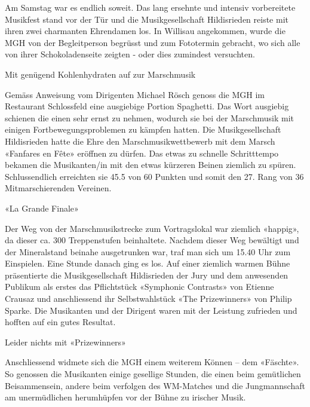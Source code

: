 \begin{history}
\begin{itemize}
              Am Samstag  war es endlich soweit. Das lang ersehnte und intensiv
              vorbereitete Musikfest stand vor der Tür und die Musikgesellschaft
              Hildisrieden reiste mit ihren zwei charmanten Ehrendamen los. In
              Willisau angekommen, wurde die MGH von der Begleitperson begrüsst und
              zum Fototermin gebracht, wo sich alle von ihrer Schokoladenseite zeigten
              - oder dies zumindest versuchten.

              Mit genügend Kohlenhydraten auf zur Marschmusik

              Gemäss Anweisung vom Dirigenten Michael Rösch genoss die MGH im
              Restaurant Schlossfeld eine ausgiebige Portion Spaghetti. Das Wort
              ausgiebig schienen die einen sehr ernst zu nehmen, wodurch sie bei der
              Marschmusik mit einigen Fortbewegungsproblemen zu kämpfen hatten. Die
              Musikgesellschaft Hildisrieden hatte die Ehre den Marschmusikwettbewerb
              mit dem Marsch «Fanfares en Fête» eröffnen zu dürfen. Das etwas zu
              schnelle Schritttempo bekamen die Musikanten/in mit den etwas kürzeren
              Beinen ziemlich zu spüren. Schlussendlich  erreichten sie 45.5 von 60
              Punkten und somit den 27. Rang von 36 Mitmarschierenden Vereinen.

              «La Grande Finale»

              Der Weg von der Marschmusikstrecke zum Vortragslokal war ziemlich
              «happig», da dieser ca. 300 Treppenstufen beinhaltete. Nachdem dieser
              Weg bewältigt und der Mineralstand beinahe ausgetrunken war, traf man
              sich um 15.40 Uhr zum Einspielen. Eine Stunde danach ging es los. Auf
              einer ziemlich warmen Bühne präsentierte die Musikgesellschaft
              Hildisrieden der Jury und dem anwesenden Publikum als erstes das
              Pflichtstück «Symphonic Contrasts» von Etienne Crausaz und anschliessend
              ihr Selbstwahlstück «The Prizewinners» von Philip Sparke. Die Musikanten
              und der Dirigent waren mit der Leistung zufrieden und hofften auf ein
              gutes Resultat.

              Leider nichts mit «Prizewinners»

              Anschliessend widmete sich die MGH einem weiterem Können – dem
              «Fäschte». So genossen die Musikanten einige gesellige Stunden, die
              einen beim gemütlichen Beisammensein, andere beim verfolgen des
              WM-Matches und die Jungmannschaft am unermüdlichen herumhüpfen vor der
              Bühne zu irischer Musik.


\end{itemize}
\end{history}
